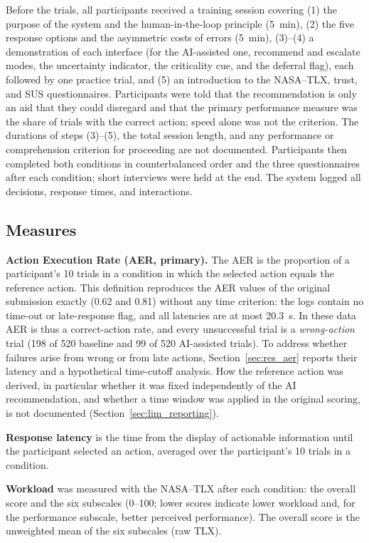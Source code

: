 \documentclass[journal]{IEEEtran}
\theoremstyle{plain}
\theoremstyle{definition}
\begin{document}
    Before the trials, all participants received a training session covering (1) the purpose of the system and the human-in-the-loop principle (5~min), (2) the five response options and the asymmetric costs of errors (5~min), (3)--(4) a demonstration of each interface (for the AI-assisted one, recommend and escalate modes, the uncertainty indicator, the criticality cue, and the deferral flag), each followed by one practice trial, and (5) an introduction to the NASA--TLX, trust, and SUS questionnaires. Participants were told that the recommendation is only an aid that they could disregard and that the primary performance measure was the share of trials with the correct action; speed alone was not the criterion. The durations of steps (3)--(5), the total session length, and any performance or comprehension criterion for proceeding are not documented. Participants then completed both conditions in counterbalanced order and the three questionnaires after each condition; short interviews were held at the end. The system logged all decisions, response times, and interactions.

    \subsection{Measures}
    \label{sec:measures}
    \textbf{Action Execution Rate (AER, primary).}
    The AER is the proportion of a participant's 10 trials in a condition in which the selected action equals the reference action. This definition reproduces the AER values of the original submission exactly (0.62 and 0.81) without any time criterion: the logs contain no time-out or late-response flag, and all latencies are at most 20.3~s. In these data AER is thus a correct-action rate, and every unsuccessful trial is a \emph{wrong-action} trial (198 of 520 baseline and 99 of 520 AI-assisted trials). To address whether failures arise from wrong or from late actions, Section~\ref{sec:res_aer} reports their latency and a hypothetical time-cutoff analysis. How the reference action was derived, in particular whether it was fixed independently of the AI recommendation, and whether a time window was applied in the original scoring, is not documented (Section~\ref{sec:lim_reporting}).

    \textbf{Response latency} is the time from the display of actionable information until the participant selected an action, averaged over the participant's 10 trials in a condition.

    \textbf{Workload} was measured with the NASA--TLX \cite{Hart1988} after each condition: the overall score and the six subscales (0--100; lower scores indicate lower workload and, for the performance subscale, better perceived performance). The overall score is the unweighted mean of the six subscales (raw TLX).
\end{document}
